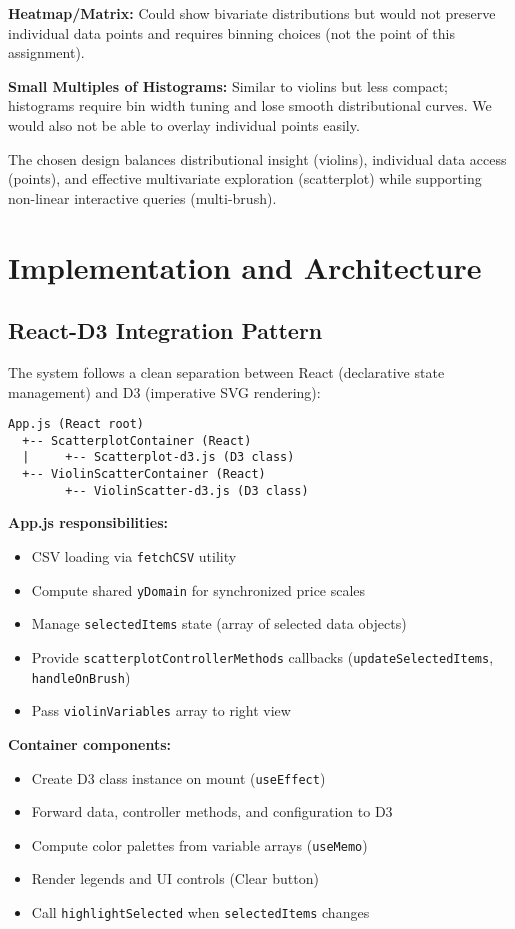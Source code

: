 \documentclass[sigplan,screen]{acmart}
\begin{document}
\textbf{Heatmap/Matrix:} Could show bivariate distributions but would
not preserve individual data points and requires binning choices (not the 
point of this assignment).

\textbf{Small Multiples of Histograms:} Similar to violins but less
compact; histograms require bin width tuning and lose smooth
distributional curves. We would also not be able to overlay individual points easily.

The chosen design balances distributional insight (violins), individual
data access (points), and effective multivariate exploration (scatterplot)
while supporting non-linear interactive queries (multi-brush).

\section{Implementation and Architecture}
\label{sec:implementation}

\subsection{React-D3 Integration Pattern}

The system follows a clean separation between React (declarative state
management) and D3 (imperative SVG rendering):

\begin{verbatim}
App.js (React root)
  +-- ScatterplotContainer (React)
  |     +-- Scatterplot-d3.js (D3 class)
  +-- ViolinScatterContainer (React)
        +-- ViolinScatter-d3.js (D3 class)
\end{verbatim}

\textbf{App.js responsibilities:}
\begin{itemize}
\item CSV loading via \texttt{fetchCSV} utility
\item Compute shared \texttt{yDomain} for synchronized price scales
\item Manage \texttt{selectedItems} state (array of selected data
      objects)
\item Provide \texttt{scatterplotControllerMethods} callbacks
      (\texttt{updateSelectedItems}, \texttt{handleOnBrush})
\item Pass \texttt{violinVariables} array to right view
\end{itemize}

\textbf{Container components:}
\begin{itemize}
\item Create D3 class instance on mount (\texttt{useEffect})
\item Forward data, controller methods, and configuration to D3
\item Compute color palettes from variable arrays (\texttt{useMemo})
\item Render legends and UI controls (Clear button)
\item Call \texttt{highlightSelected} when \texttt{selectedItems}
      changes
\end{itemize}
\end{document}

